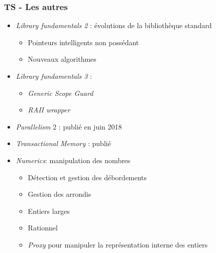 \documentclass[C++.tex]{subfiles}
\begin{document}
\begin{frame}
	\frametitle{TS - Les autres}
	\begin{itemize}
		\item \textit{Library fundamentals 2} : évolutions de la bibliothèque standard
		\begin{itemize}
			\item Pointeurs intelligents non possédant
			\item Nouveaux algorithmes
		\end{itemize}
		\item \textit{Library fundamentals 3} :
		\begin{itemize}
			\item \textit{Generic Scope Guard}
			\item \textit{RAII wrapper}
		\end{itemize}
		\item \textit{Parallelism} 2 : publié en juin 2018
		\item \textit{Transactional Memory} : publié
		\item \textit{Numerics}: manipulation des nombres
		\begin{itemize}
			\item Détection et gestion des débordements
			\item Gestion des arrondis
			\item Entiers larges
			\item Rationnel
			\item \textit{Proxy} pour manipuler la représentation interne des entiers
		\end{itemize}
	\end{itemize}
\end{frame}
\end{document}

